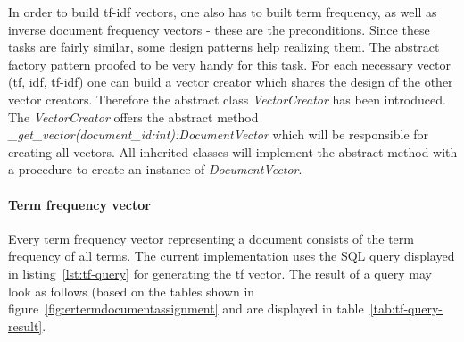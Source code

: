 \noindent
In order to build tf-idf vectors, one also has to built term frequency, as well as inverse document frequency vectors - these are the preconditions.
Since these tasks are fairly similar, some design patterns help realizing them.
The \gls{abstract factory} pattern proofed to be very handy for this task.
For each necessary vector (tf, idf, tf-idf) one can build a vector creator which shares the design of the other vector creators.
Therefore the abstract class \textit{VectorCreator} has been introduced.
The \textit{VectorCreator} offers the abstract method \textit{\_get\_vector(document\_id:int):DocumentVector} which will be responsible for creating all vectors.
All inherited classes will implement the abstract method with a procedure to create an instance of \textit{DocumentVector}.

\paragraph{Term frequency vector}
Every term frequency vector representing a document consists of the term frequency of all terms.
The current implementation uses the SQL query displayed in listing~\ref{lst:tf-query} for generating the tf vector.
The result of a query may look as follows (based on the tables shown in figure~\ref{fig:ertermdocumentassignment} and are displayed in table~\ref{tab:tf-query-result}.

